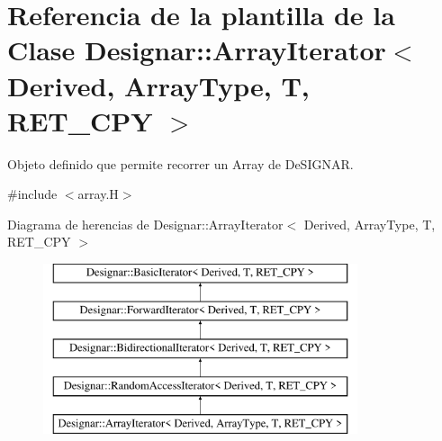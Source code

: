 \hypertarget{class_designar_1_1_array_iterator}{}\section{Referencia de la plantilla de la Clase Designar\+:\+:Array\+Iterator$<$ Derived, Array\+Type, T, R\+E\+T\+\_\+\+C\+PY $>$}
\label{class_designar_1_1_array_iterator}


Objeto definido que permite recorrer un Array de De\+S\+I\+G\+N\+AR.  




{\ttfamily \#include $<$array.\+H$>$}

Diagrama de herencias de Designar\+:\+:Array\+Iterator$<$ Derived, Array\+Type, T, R\+E\+T\+\_\+\+C\+PY $>$\begin{figure}[H]
\begin{center}
\leavevmode
\includegraphics[height=5.000000cm]{class_designar_1_1_array_iterator}
\end{center}
\end{figure}
